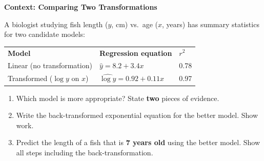 \documentclass[10pt]{article}
\begin{document}
\vspace{0.12in}

\begin{tcolorbox}[colback=white, colframe=black!40, boxrule=0.8pt, arc=2mm,
    left=4mm, right=4mm, top=3mm, bottom=3mm,
    title={\textbf{Tier E --- Extension}}, fonttitle=\bfseries, halign title=center]
\small

\textbf{Context: Comparing Two Transformations}

A biologist studying fish length ($y$, cm) vs.\ age ($x$, years) has summary statistics for
two candidate models:

\vspace{6pt}
\renewcommand{\arraystretch}{1.4}
\begin{tabularx}{\linewidth}{@{} l X X @{}}
\rowcolor{sky} \textbf{Model} & \textbf{Regression equation} & \textbf{$r^2$} \\
Linear (no transformation) & $\hat{y} = 8.2 + 3.4x$ & 0.78 \\
Transformed ($\log y$ on $x$) & $\widehat{\log y} = 0.92 + 0.11x$ & 0.97 \\
\end{tabularx}

\vspace{10pt}

\begin{enumerate}[leftmargin=1.6em, itemsep=0.18in]

  \item Which model is more appropriate? State \textbf{two} pieces of evidence.\\[8pt]

  \item Write the back-transformed exponential equation for the better model. Show work.\\[8pt]

  \item Predict the length of a fish that is \textbf{7 years old} using the better model.
        Show all steps including the back-transformation.\\[8pt]


\end{enumerate}
\end{tcolorbox}
\end{document}
